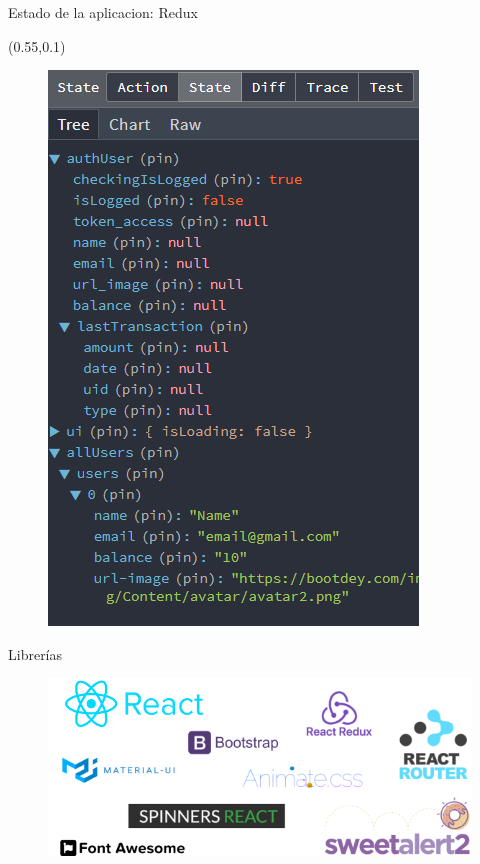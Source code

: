 \documentclass[xcolor=pdftex,dvipsnames,table]{beamer}
\begin{document}
\begin{frame}{Estado de la aplicacion: Redux}
{    \begin{textblock*}{0.45\textwidth}(0.55\textwidth,0.1\textwidth)
            \begin{figure}
                \centering
                \includegraphics[width=0.87\linewidth]{front/estado redux.png}
            \end{figure}
    \end{textblock*}
    

}
\end{frame}
\begin{frame}{Librerías}
        \begin{figure}
            \centering
            \includegraphics[width=1\linewidth]{front/librerias.png}
            \label{fig:my_label}
        \end{figure}
\end{frame}
\end{document}
